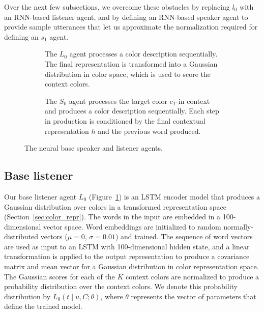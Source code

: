 \documentclass[11pt,letterpaper]{article}
\newcommand{\Listener}{L}
\newcommand{\Speaker}{S}
\newcommand{\utt}{u}
\newcommand{\context}{C}
\newcommand{\contextlen}{K}
\newcommand{\target}{t}
\renewcommand{\|}{\mid}
\newcommand{\secref}[1]{Section~\ref{#1}}
\newcommand{\figref}[1]{Figure~\ref{#1}}
\begin{document}
Over the next few subsections, we overcome these obstacles by
replacing $l_{0}$ with an RNN-based listener agent, and by defining an
RNN-based speaker agent to provide sample
utterances that let us approximate the normalization required for
defining an $s_{1}$ agent.

\begin{figure}[t]
  \centering
   \begin{subfigure}[b]{0.48\textwidth}
    \centering
    
    \caption{The $\Listener_{0}$ agent processes a color description
      sequentially. The final representation is transformed into a
      Gaussian distribution in color space, which is used to score the
      context colors.}
    \label{fig:model:listener}
  \end{subfigure}
  \hfill
  \begin{subfigure}[b]{0.48\textwidth}
    \centering
    
    \caption{The $\Speaker_{0}$ agent processes the target color
      $c_{T}$ in context and produces a color description
      sequentially. Each step in production is conditioned by the
      final contextual representation $h$ and the previous word
      produced.}
    \label{fig:model:speaker}
  \end{subfigure}
  \caption{The neural base speaker and listener agents.}
  \label{fig:model}
\end{figure}

\subsection{Base listener}

Our base listener agent $\Listener_0$ (\figref{fig:model:listener}) is an LSTM encoder model that produces a Gaussian
distribution over colors in a transformed representation space (\secref{sec:color_repr}).
The words in the input are embedded in a 100-dimensional vector space. Word embeddings
are initialized to random normally-distributed vectors ($\mu = 0$, $\sigma = 0.01$)
and trained. The sequence of word vectors are
used as input to an LSTM with 100-dimensional hidden state, and a linear
transformation is applied to the output representation to produce a covariance matrix
and mean vector for a Gaussian distribution in color representation space.
The Gaussian scores for each of the $\contextlen$ context colors are normalized to
produce a probability distribution over the context colors. We denote this probability
distribution by $\Listener_0(\target \| \utt, \context; \theta)$, where $\theta$ represents the
vector of parameters that define the trained model.
\end{document}
